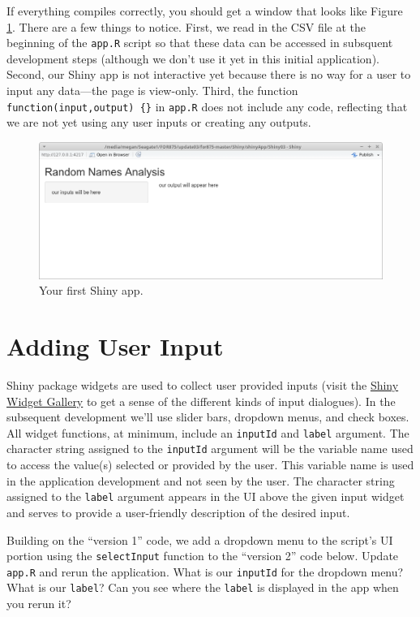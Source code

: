 \documentclass[12pt,oneside]{book}\usepackage[]{graphicx}\usepackage[]{color}
\begin{document}
If everything compiles correctly, you should get a window that looks like Figure \ref{fig:fig2}. There are a few things to notice. First, we read in the CSV file at the beginning of the \verb+app.R+ script so that these data can be accessed in subsquent development steps (although we don't use it yet in this initial application). Second, our Shiny app is not interactive yet because there is no way for a user to input any data---the page is view-only. Third, the function \verb+function(input,output) {}+ in \verb+app.R+ does not include any code, reflecting that we are not yet using any user inputs or creating any outputs. 


\begin{figure}[htbp]
\includegraphics[width=5.5in]{09-shiny/09-images/appSimple.png}
\centering
\caption{Your first Shiny app.}
\label{fig:fig2}
\end{figure}


\section{Adding User Input}

Shiny package widgets are used to collect user provided inputs (visit the \href{https://shiny.rstudio.com/gallery/widget-gallery.html}{Shiny Widget Gallery} to get a sense of the different kinds of input dialogues). In the subsequent development we'll use slider bars, dropdown menus, and check boxes. All widget functions, at minimum, include an \verb+inputId+ and \verb+label+ argument. The character string assigned to the \verb+inputId+ argument will be the variable name used to access the value(s) selected or provided by the user. This variable name is used in the application development and not seen by the user.  The character string assigned to the \verb+label+ argument appears in the UI above the given input widget and serves to provide a user-friendly description of the desired input.

Building on the ``version 1'' code, we add a dropdown menu to the script's UI portion using the \verb+selectInput+ function to the ``version 2'' code below. Update \verb+app.R+ and rerun the application. What is our \verb+inputId+ for the dropdown menu? What is our \verb+label+? Can you see where the \verb+label+ is displayed in the app when you rerun it?
\end{document}
